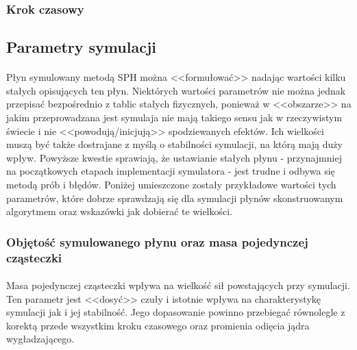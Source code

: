 \par

\subsubsection{Krok czasowy}

\paragraph{}

\par

\subsection{Parametry symulacji}

\paragraph{}
Płyn symulowany metodą SPH można <<formułować>> nadając wartości kilku stałych opisujących ten płyn. Niektórych wartości parametrów nie można jednak przepisać bezpośrednio z tablic stałych fizycznych, ponieważ w <<obszarze>> na jakim przeprowadzana jest symulaja nie mają takiego sensu jak w rzeczywistym świecie i nie <<powodują/inicjują>> spodziewanych efektów. Ich wielkości muszą być także dostrajane z myślą o stabilności symulacji, na którą mają duży wpływ. Powyższe kwestie sprawiają, że ustawianie stałych płynu - przynajmniej na początkowych etapach implementacji symulatora - jest trudne i odbywa się metodą prób i błędów. Poniżej umieszczone zostały przykładowe wartości tych parametrów, które dobrze sprawdzają się dla symulacji płynów skonstruowanym algorytmem oraz wskazówki jak dobierać te wielkości.
\par

\subsubsection{Objętość symulowanego płynu oraz masa pojedynczej cząsteczki}

\paragraph{}
Masa pojedynczej cząsteczki wpływa na wielkość sił powstających przy symulacji. Ten parametr jest <<dosyć>> czuły i istotnie wpływa na charakterystykę symulacji jak i jej stabilność. Jego dopasowanie powinno przebiegać równolegle z korektą przede wszystkim kroku czasowego oraz promienia odięcia jądra wygładzającego.
\par

